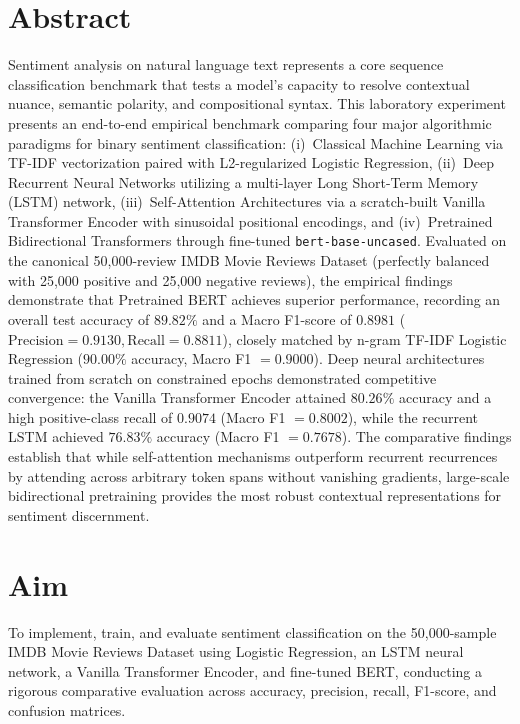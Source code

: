 \documentclass[12pt,a4paper]{report}
\begin{document}
\section{Abstract}
Sentiment analysis on natural language text represents a core sequence classification benchmark that tests a model's capacity to resolve contextual nuance, semantic polarity, and compositional syntax. This laboratory experiment presents an end-to-end empirical benchmark comparing four major algorithmic paradigms for binary sentiment classification: (i)~Classical Machine Learning via TF-IDF vectorization paired with L2-regularized Logistic Regression, (ii)~Deep Recurrent Neural Networks utilizing a multi-layer Long Short-Term Memory (LSTM) network, (iii)~Self-Attention Architectures via a scratch-built Vanilla Transformer Encoder with sinusoidal positional encodings, and (iv)~Pretrained Bidirectional Transformers through fine-tuned \texttt{bert-base-uncased}. Evaluated on the canonical 50,000-review IMDB Movie Reviews Dataset (perfectly balanced with 25,000 positive and 25,000 negative reviews), the empirical findings demonstrate that Pretrained BERT achieves superior performance, recording an overall test accuracy of $89.82\%$ and a Macro F1-score of $0.8981$ ($\text{Precision}=0.9130, \text{Recall}=0.8811$), closely matched by n-gram TF-IDF Logistic Regression ($90.00\%$ accuracy, Macro F1 $= 0.9000$). Deep neural architectures trained from scratch on constrained epochs demonstrated competitive convergence: the Vanilla Transformer Encoder attained $80.26\%$ accuracy and a high positive-class recall of $0.9074$ (Macro F1 $= 0.8002$), while the recurrent LSTM achieved $76.83\%$ accuracy (Macro F1 $= 0.7678$). The comparative findings establish that while self-attention mechanisms outperform recurrent recurrences by attending across arbitrary token spans without vanishing gradients, large-scale bidirectional pretraining provides the most robust contextual representations for sentiment discernment.

\section{Aim}
To implement, train, and evaluate sentiment classification on the 50,000-sample IMDB Movie Reviews Dataset using Logistic Regression, an LSTM neural network, a Vanilla Transformer Encoder, and fine-tuned BERT, conducting a rigorous comparative evaluation across accuracy, precision, recall, F1-score, and confusion matrices.
\end{document}
